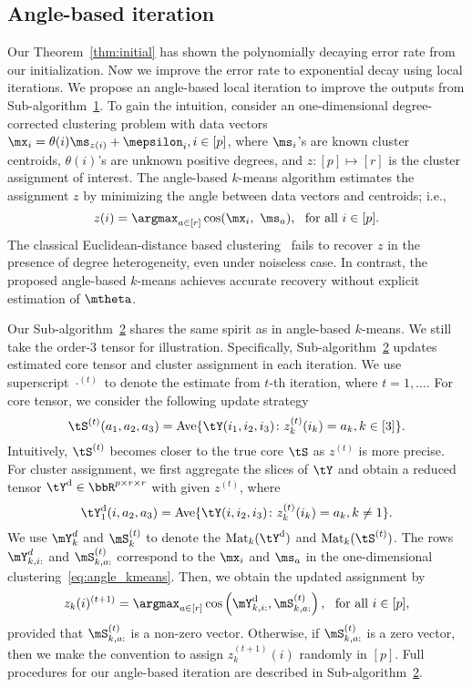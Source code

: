 \documentclass[lettersize,onecolumn,journal]{IEEEtran}
\theoremstyle{definition}
\theoremstyle{definition}
\newcommand{\of}[1]{\left(#1\right)}
\begin{document}
\subsection{Angle-based iteration}\label{subsec:angle}
Our Theorem~\ref{thm:initial} has shown the polynomially decaying error rate from our initialization. Now we improve the error rate to exponential decay using local iterations. %
We propose an angle-based local iteration to improve the outputs from Sub-algorithm~\hyperref[alg:main]{1}. 
To gain the intuition, consider an one-dimensional degree-corrected clustering problem with data vectors $\mx_i = \theta(i) \ms_{z(i)} + \mepsilon_i, i \in [p]$, where $\ms_i$'s are known cluster centroids, $\theta(i)$'s are unknown positive degrees, and $z\colon [p] \mapsto [r]$ is the cluster assignment of interest. The angle-based $k$-means algorithm estimates the assignment $z$ by minimizing the angle between data vectors and centroids; i.e., 
 \begin{equation}\label{eq:angle_kmeans}
     z(i) = \argmax_{a \in [r]} \cos ( \mx_i,\ \ms_{a} ),\ \text{ for all }i \in [p].
 \end{equation}
The classical Euclidean-distance based clustering~\citep{han2020exact} fails to recover $z$ in the presence of degree heterogeneity, even under noiseless case. In contrast, the proposed angle-based $k$-means achieves accurate recovery without explicit estimation of $\mtheta$. 

Our Sub-algorithm~\hyperref[alg:main]{2} shares the same spirit as in angle-based $k$-means. We still take the order-3 tensor for illustration. Specifically, Sub-algorithm~\hyperref[alg:main]{2} updates estimated core tensor and cluster assignment in each iteration. We use superscript $\cdot^{(t)}$ to denote the estimate from $t$-th iteration, where $t=1,\ldots.$ For core tensor, we consider the following update strategy  
 \[
 \tS^{(t)}(a_1,a_2,a_3)=\text{Ave}\{\tY(i_1,i_2,i_3)\colon z^{(t)}_k(i_k)=a_k, k\in[3]\}.
\]
Intuitively, $\tS^{(t)}$ becomes closer to the true core $\tS$ as $z^{(t)}$ is more precise. For cluster assignment, we first aggregate the slices of $\tY$ and obtain a reduced tensor $\tY^{\text{d}}\in \bbR^{p \times r \times r}$ with given $z^{(t)}$, where
\[
\tY^{\text{d}}_1(i,a_2,a_3)=\text{Ave}\{\tY(i,i_2,i_3)\colon z^{(t)}_k(i_k)=a_k, k \neq 1\}.
\]
We use $\mY_k^d$ and $ \mS^{(t)}_k$ to denote the $\text{Mat}_k(\tY^{\text{d}})$ and $\text{Mat}_k(\tS^{(t)})$. The rows $\mY^d_{k,i:}$ and $\mS^{(t)}_{k,a:}$ correspond to the $\mx_i$ and $\ms_a$ in the one-dimensional clustering~\eqref{eq:angle_kmeans}. Then, we obtain the updated assignment by
\[
z_k(i)^{(t+1)} = \argmax_{a \in [r]} \cos \of{ \mY^{\text{d}}_{k,i:}, \mS^{(t)}_{k,a:} },\ \text{ for all } i \in [p],
\]
provided that $\mS^{(t)}_{k,a:}$ is a non-zero vector. Otherwise, if $\mS^{(t)}_{k,a:}$ is a zero vector, then we make the convention to assign $z^{(t+1)}_k(i)$ randomly in $[p]$. Full procedures for our angle-based iteration are described in Sub-algorithm~\hyperref[alg:main]{2}. 
\end{document}
